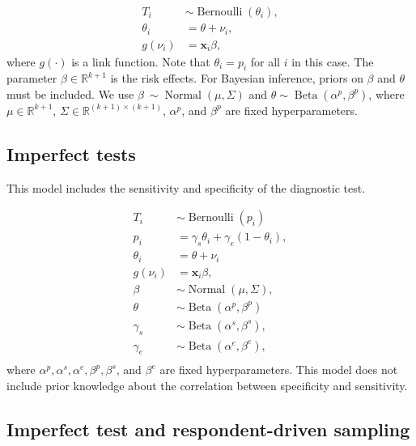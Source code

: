 \documentclass[a4paper, notitlepage, 11pt]{article}
\newcommand{\R}{\mathbb{R}}
\newcommand{\x}{\boldsymbol{x}}
\newcommand{\N}{\operatorname{Normal}}
\newcommand{\betadist}{\operatorname{Beta}}
\theoremstyle{definition}
\theoremstyle{remark}
\begin{document}
\begin{equation}
  \begin{aligned}
    T_i &\sim \operatorname{Bernoulli}(\theta_i), \\
    \theta_i &= \theta + \nu_i, \\
    g(\nu_i) &= \x_i\beta, 
  \end{aligned}  
\end{equation}
where $g(\cdot)$ is a link function. Note that $\theta_i = p_i$ for all $i$ in this case.
The parameter $\beta \in \R^{k+1}$ is the risk effects. For Bayesian inference, priors on
$\beta$ and $\theta$ must be included. We use $\beta ~ \sim \N(\mu, \Sigma)$
and $\theta \sim \betadist(\alpha^{p}, \beta^p)$, where $\mu
\in \R^{k+1}$, $\Sigma \in \R^{(k+1)\times(k+1)}$, $\alpha^p$, and $\beta^p$ are fixed hyperparameters. 

\subsection{Imperfect tests}

This model includes the sensitivity and specificity of the diagnostic test. 

\begin{equation}
  \begin{aligned}
    T_i &\sim \operatorname{Bernoulli}(p_i) \\
    p_i &= \gamma_s\theta_i + \gamma_e(1 - \theta_i),  \\
    \theta_i &= \theta + \nu_i \\
    g(\nu_i) &= \x_i\beta,  \\
    \beta &\sim \N(\mu, \Sigma), \\ 
    \theta &\sim \betadist(\alpha^p, \beta^p) \\
    \gamma_s &\sim \betadist(\alpha^s, \beta^s), \\
    \gamma_e &\sim \betadist(\alpha^e, \beta^e), \\    
  \end{aligned}  
\end{equation}
where $\alpha^p, \alpha^s, \alpha^e, \beta^p, \beta^s$, and $\beta^e$ are fixed hyperparameters.
This model does not include prior knowledge about the correlation between
specificity and sensitivity. 

\subsection{Imperfect test and respondent-driven sampling}
\end{document}
